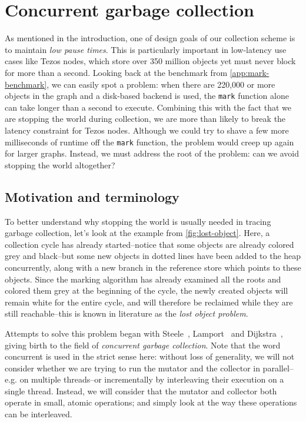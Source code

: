 \section{Concurrent garbage collection}

As mentioned in the introduction, one of design goals of our collection scheme is to maintain \emph{low pause times}. This is particularly important in low-latency use cases like Tezos nodes, which store over 350 million objects yet must never block for more than a second. Looking back at the benchmark from \cref{app:mark-benchmark}, we can easily spot a problem: when there are 220,000 or more objects in the graph and a disk-based backend is used, the \texttt{mark} function alone can take longer than a second to execute. Combining this with the fact that we are stopping the world during collection, we are more than likely to break the latency constraint for Tezos nodes. Although we could try to shave a few more milliseconds of runtime off the \texttt{mark} function, the problem would creep up again for larger graphs. Instead, we must address the root of the problem: can we avoid stopping the world altogether?

\subsection{Motivation and terminology}

To better understand why stopping the world is usually needed in tracing garbage collection, let's look at the example from \cref{fig:lost-object}. Here, a collection cycle has already started--notice that some objects are already colored grey and black--but some new objects in dotted lines have been added to the heap concurrently, along with a new branch in the reference store which points to these objects. Since the marking algorithm has already examined all the roots and colored them grey at the beginning of the cycle, the newly created objects will remain white for the entire cycle, and will therefore be reclaimed while they are still reachable--this is known in literature as the \emph{lost object problem}.

\vspace{-.5em}


Attempts to solve this problem began with Steele~\cite{steele75}, Lamport~\cite{lamport76} and Dijkstra~\cite{dijkstra78}, giving birth to the field of \emph{concurrent garbage collection}. Note that the word concurrent is used in the strict sense here: without loss of generality, we will not consider whether we are trying to run the mutator and the collector in parallel--e.g. on multiple threads--or incrementally by interleaving their execution on a single thread. Instead, we will consider that the mutator and collector both operate in small, atomic operations; and simply look at the way these operations can be interleaved.

